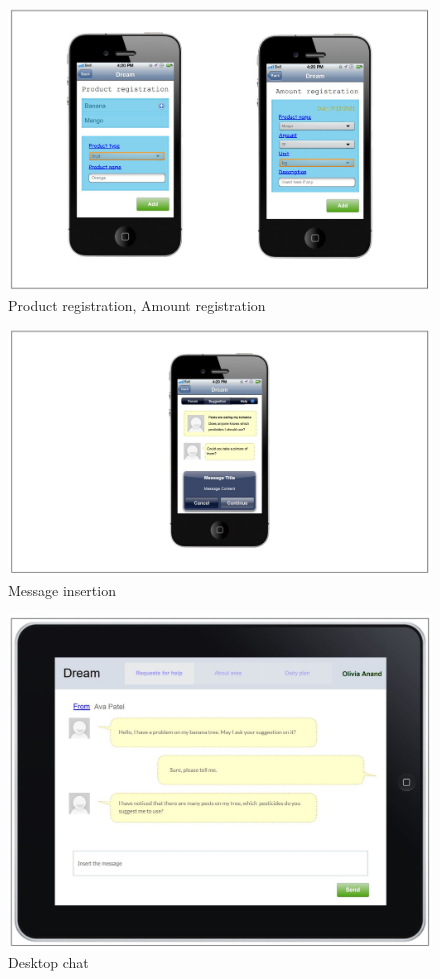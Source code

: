 \begin{figure}[H]
	\centering
    \includegraphics[page=1, width=\textwidth]{Images/product_amount_registration.JPG}
	\caption{\label{fig:FE_image2}Product registration, Amount registration}

\end{figure}



\begin{figure}[H]
	\centering
    \includegraphics[page=1, width=\textwidth]{Images/message_insertion.JPG}
	\caption{\label{fig:FE_image3}Message insertion}

\end{figure}

\begin{figure}[H]
	\centering
    \includegraphics[page=1, width=\textwidth]{Images/desktop_chat.JPG}

	\caption{\label{fig:FE_image4}Desktop chat}

\end{figure}